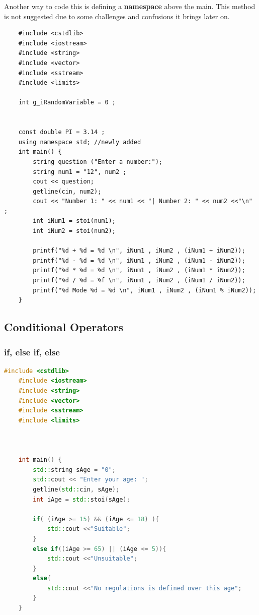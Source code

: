 \documentclass[12pt , a4paper]{article}
\begin{document}
Another way to code this is defining a \textbf{namespace} above the main. This method is not suggested due to some challenges and confusions it brings later on.\\
	\begin{lstlisting}
	#include <cstdlib> 
	#include <iostream>
	#include <string>
	#include <vector>
	#include <sstream>
	#include <limits> 
	
	int g_iRandomVariable = 0 ;

	
	const double PI = 3.14 ;
	using namespace std; //newly added
	int main() {
	    string question ("Enter a number:");
	    string num1 = "12", num2 ;
	    cout << question;
	    getline(cin, num2);
	    cout << "Number 1: " << num1 << "| Number 2: " << num2 <<"\n" ;
	    int iNum1 = stoi(num1);
	    int iNum2 = stoi(num2);
	
	    printf("%d + %d = %d \n", iNum1 , iNum2 , (iNum1 + iNum2));
	    printf("%d - %d = %d \n", iNum1 , iNum2 , (iNum1 - iNum2));
	    printf("%d * %d = %d \n", iNum1 , iNum2 , (iNum1 * iNum2));
	    printf("%d / %d = %f \n", iNum1 , iNum2 , (iNum1 / iNum2));
	    printf("%d Mode %d = %d \n", iNum1 , iNum2 , (iNum1 % iNum2));
	}
	\end{lstlisting}

	\subsection{Conditional Operators}

	\subsubsection{if, else if, else}

	\begin{lstlisting}[language=C++]
	#include <cstdlib>
	#include <iostream>
	#include <string>
	#include <vector>
	#include <sstream>
	#include <limits>
	
	
	
	int main() {
	    std::string sAge = "0";
	    std::cout << "Enter your age: ";
	    getline(std::cin, sAge);
	    int iAge = std::stoi(sAge);
	
	    if( (iAge >= 15) && (iAge <= 18) ){
	        std::cout <<"Suitable";
	    }
	    else if((iAge >= 65) || (iAge <= 5)){
	        std::cout <<"Unsuitable";
	    }
	    else{
	        std::cout <<"No regulations is defined over this age";
	    }
	}
	\end{lstlisting}
\end{document}
